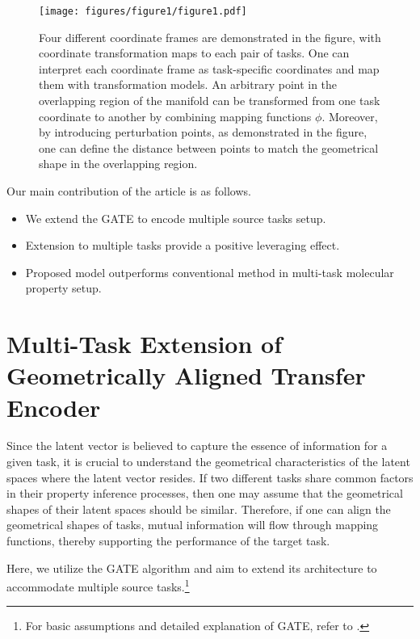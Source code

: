 \begin{figure}[t!]
\begin{center}
\texttt{[image: figures/figure1/figure1.pdf]}
\end{center}
\caption{Four different coordinate frames are demonstrated in the figure, with coordinate transformation maps to each pair of tasks. One can interpret each coordinate frame as task-specific coordinates and map them with transformation models. An arbitrary point in the overlapping region of the manifold can be transformed from one task coordinate to another by combining mapping functions $\phi$. Moreover, by introducing perturbation points, as demonstrated in the figure, one can define the distance between points to match the geometrical shape in the overlapping region.}
\label{fig:fig1}
\end{figure}

Our main contribution of the article is as follows.
\begin{itemize}
    \item We extend the GATE to encode multiple source tasks setup.
    \item Extension to multiple tasks provide a positive leveraging effect.
    \item Proposed model outperforms conventional method in multi-task molecular property setup.
\end{itemize}












\section{Multi-Task Extension of Geometrically Aligned Transfer Encoder}
Since the latent vector is believed to capture the essence of information for a given task, it is crucial to understand the geometrical characteristics of the latent spaces where the latent vector resides. If two different tasks share common factors in their property inference processes, then one may assume that the geometrical shapes of their latent spaces should be similar. Therefore, if one can align the geometrical shapes of tasks, mutual information will flow through mapping functions, thereby supporting the performance of the target task.

Here, we utilize the GATE algorithm and aim to extend its architecture to accommodate multiple source tasks.\footnote{For basic assumptions and detailed explanation of GATE, refer to \cite{ko2023geometrically}.}

